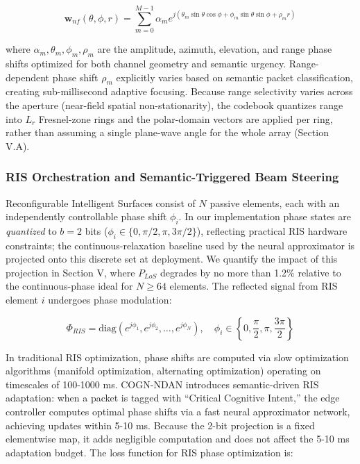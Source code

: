 \documentclass{BVP_CINC}
\newcommand{\COGN}{COGN-NDAN}
\begin{document}
\begin{equation}
    \mathbf{w}_{nf}(\theta, \phi, r) = \sum_{m=0}^{M-1} \alpha_m e^{j(\theta_m \sin\theta \cos\phi + \phi_m \sin\theta \sin\phi + \rho_m r)}
\end{equation}

where $\alpha_m, \theta_m, \phi_m, \rho_m$ are the amplitude, azimuth, elevation, and range phase shifts optimized for both channel geometry and semantic urgency. Range-dependent phase shift $\rho_m$ explicitly varies based on semantic packet classification, creating sub-millisecond adaptive focusing. Because range selectivity varies across the aperture (near-field spatial non-stationarity), the codebook quantizes range into $L_r$ Fresnel-zone rings and the polar-domain vectors are applied per ring, rather than assuming a single plane-wave angle for the whole array (Section V.A).

\subsubsection{RIS Orchestration and Semantic-Triggered Beam Steering}
Reconfigurable Intelligent Surfaces consist of $N$ passive elements, each with an independently controllable phase shift $\phi_i$. In our implementation phase states are \emph{quantized} to $b = 2$ bits ($\phi_i \in \{0, \pi/2, \pi, 3\pi/2\}$), reflecting practical RIS hardware constraints; the continuous-relaxation baseline used by the neural approximator is projected onto this discrete set at deployment. We quantify the impact of this projection in Section V, where $P_{LoS}$ degrades by no more than 1.2\% relative to the continuous-phase ideal for $N \ge 64$ elements. The reflected signal from RIS element $i$ undergoes phase modulation:

\begin{equation}
    \Phi_{RIS} = \text{diag}(e^{j\phi_1}, e^{j\phi_2}, \ldots, e^{j\phi_N}), \quad \phi_i \in \left\{0, \frac{\pi}{2}, \pi, \frac{3\pi}{2}\right\}
\end{equation}

In traditional RIS optimization, phase shifts are computed via slow optimization algorithms (manifold optimization, alternating optimization) operating on timescales of 100-1000 ms. \COGN{} introduces semantic-driven RIS adaptation: when a packet is tagged with ``Critical Cognitive Intent,'' the edge controller computes optimal phase shifts via a fast neural approximator network, achieving updates within 5-10 ms. Because the 2-bit projection is a fixed elementwise map, it adds negligible computation and does not affect the 5-10 ms adaptation budget. The loss function for RIS phase optimization is:
\end{document}
